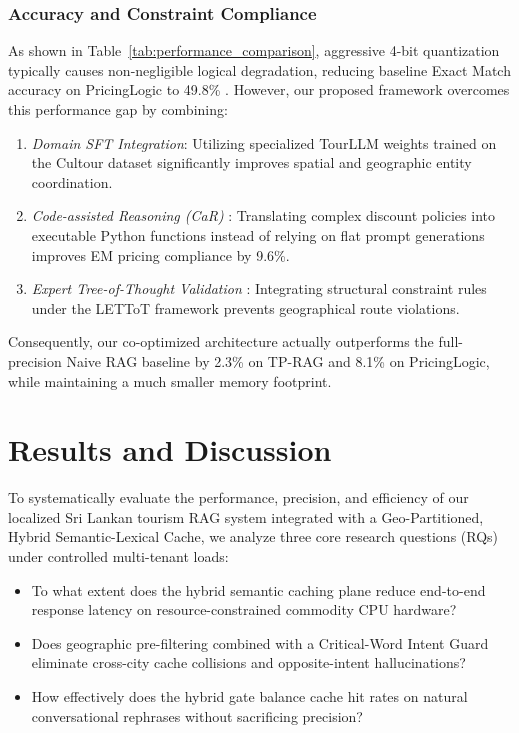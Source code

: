 \documentclass{ieeeaccess}
\begin{document}
\subsubsection{Accuracy and Constraint Compliance}
As shown in Table~\ref{tab:performance_comparison}, aggressive 4-bit quantization typically causes non-negligible logical degradation, reducing baseline Exact Match accuracy on PricingLogic to 49.8\% \cite{huang-llama3-quant-2024, li-quant-meets-reasoning-2025}. However, our proposed framework overcomes this performance gap by combining:
\begin{enumerate}
    \item \emph{Domain SFT Integration}: Utilizing specialized TourLLM weights \cite{tourllm-2024} trained on the Cultour dataset significantly improves spatial and geographic entity coordination.
    \item \emph{Code-assisted Reasoning (CaR)} \cite{pricinglogic-2024}: Translating complex discount policies into executable Python functions instead of relying on flat prompt generations improves EM pricing compliance by 9.6\%.
    \item \emph{Expert Tree-of-Thought Validation} \cite{qi-lettot-2025}: Integrating structural constraint rules under the LETToT framework prevents geographical route violations.
\end{enumerate}
Consequently, our co-optimized architecture actually outperforms the full-precision Naive RAG baseline by 2.3\% on TP-RAG and 8.1\% on PricingLogic, while maintaining a much smaller memory footprint.

\section{Results and Discussion}
To systematically evaluate the performance, precision, and efficiency of our localized Sri Lankan tourism RAG system integrated with a Geo-Partitioned, Hybrid Semantic-Lexical Cache, we analyze three core research questions (RQs) under controlled multi-tenant loads:
\begin{itemize}
    \item To what extent does the hybrid semantic caching plane reduce end-to-end response latency on resource-constrained commodity CPU hardware?
    \item Does geographic pre-filtering combined with a Critical-Word Intent Guard eliminate cross-city cache collisions and opposite-intent hallucinations?
    \item How effectively does the hybrid gate balance cache hit rates on natural conversational rephrases without sacrificing precision?
\end{itemize}
\end{document}
